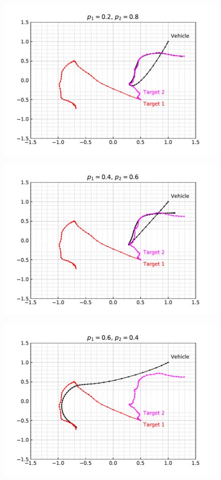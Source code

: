\documentclass[12pt]{article}
\begin{document}
\begin{figure}[H]
    \centering
    \includegraphics{../../src/task_4/output/ex_4_i=2.pdf}
\end{figure}

\begin{figure}[H]
    \centering
    \includegraphics{../../src/task_4/output/ex_4_i=3.pdf}
\end{figure}

\begin{figure}[H]
    \centering
    \includegraphics{../../src/task_4/output/ex_4_i=4.pdf}
\end{figure}
\end{document}

